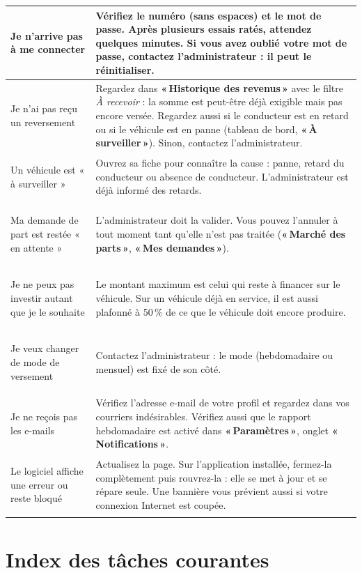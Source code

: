 \documentclass[11pt,a4paper]{article}
\newcommand{\bouton}[1]{\textbf{«\,#1\,»}}
\let\oldsection\section
\renewcommand{\section}{\clearpage\oldsection}
\begin{document}
\begin{center}
\begin{tabularx}{\linewidth}{@{}>{\bfseries\raggedright}p{4.4cm}X@{}}
\toprule
Je n'arrive pas à me connecter & Vérifiez le numéro (sans espaces) et le mot de passe. Après plusieurs essais ratés, attendez quelques minutes. Si vous avez oublié votre mot de passe, contactez l'administrateur : il peut le réinitialiser.\\
\midrule
Je n'ai pas reçu un reversement & Regardez dans \bouton{Historique des revenus} avec le filtre \textit{À recevoir} : la somme est peut-être déjà exigible mais pas encore versée. Regardez aussi si le conducteur est en retard ou si le véhicule est en panne (tableau de bord, \bouton{À surveiller}). Sinon, contactez l'administrateur.\\
\midrule
Un véhicule est « à surveiller » & Ouvrez sa fiche pour connaître la cause : panne, retard du conducteur ou absence de conducteur. L'administrateur est déjà informé des retards.\\
\midrule
Ma demande de part est restée « en attente » & L'administrateur doit la valider. Vous pouvez l'annuler à tout moment tant qu'elle n'est pas traitée (\bouton{Marché des parts}, \bouton{Mes demandes}).\\
\midrule
Je ne peux pas investir autant que je le souhaite & Le montant maximum est celui qui reste à financer sur le véhicule. Sur un véhicule déjà en service, il est aussi plafonné à 50\,\% de ce que le véhicule doit encore produire.\\
\midrule
Je veux changer de mode de versement & Contactez l'administrateur : le mode (hebdomadaire ou mensuel) est fixé de son côté.\\
\midrule
Je ne reçois pas les e-mails & Vérifiez l'adresse e-mail de votre profil et regardez dans vos courriers indésirables. Vérifiez aussi que le rapport hebdomadaire est activé dans \bouton{Paramètres}, onglet \bouton{Notifications}.\\
\midrule
Le logiciel affiche une erreur ou reste bloqué & Actualisez la page. Sur l'application installée, fermez-la complètement puis rouvrez-la : elle se met à jour et se répare seule. Une bannière vous prévient aussi si votre connexion Internet est coupée.\\
\bottomrule
\end{tabularx}
\end{center}

\section{Index des tâches courantes}\label{sec:taches}
\end{document}
